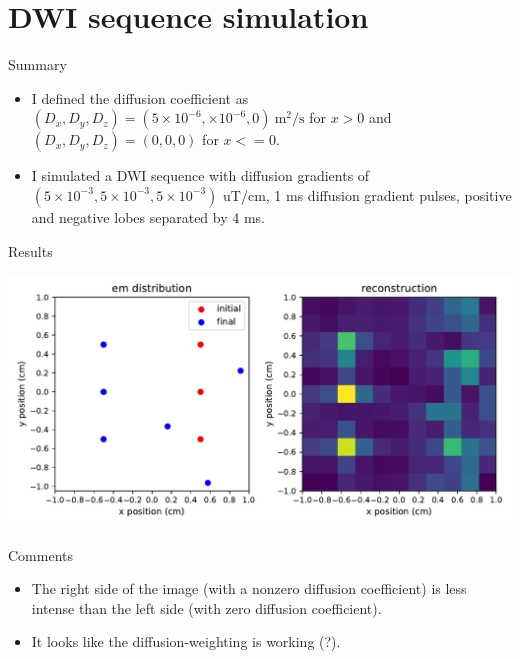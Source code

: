 \documentclass[dvipsnames]{beamer}
\begin{document}
\section{DWI sequence simulation}

\begin{frame}{Summary}
\begin{itemize}
\item I defined the diffusion coefficient as $(D_x,D_y,D_z) = (5 \times 10^{-6}, \times 10^{-6},0)~\mathrm{m^2/s}$ for $x > 0$ and $(D_x,D_y,D_z) = (0,0,0)$ for $x <=0$.
\item I simulated a DWI sequence with diffusion gradients of $(5 \times 10^{-3},5 \times 10^{-3},5 \times 10^{-3})$ uT/cm, 1 ms diffusion gradient pulses, positive and negative lobes separated by 4 ms.
\end{itemize}
\end{frame}

\begin{frame}{Results}
\begin{center}
\includegraphics[width=\textwidth]{reconstruction_diffusion}
\end{center}
\end{frame}

\begin{frame}{Comments}
\begin{itemize}
\item The right side of the image (with a nonzero diffusion coefficient) is less intense than the left side (with zero diffusion coefficient).
\item It looks like the diffusion-weighting is working (?).
\end{itemize}
\end{frame}
\end{document}
